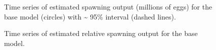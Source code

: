 \documentclass[
]{scrartcl}
\begin{document}
\begin{figure}[H]


\caption{\label{fig-es-so}Time series of estimated spawning output
(millions of eggs) for the base model (circles) with \textasciitilde{}
95\% interval (dashed lines).}

\end{figure}%

\begin{figure}[H]


\caption{\label{fig-es-sb}Time series of estimated relative spawning
output for the base model.}

\end{figure}%
\end{document}
